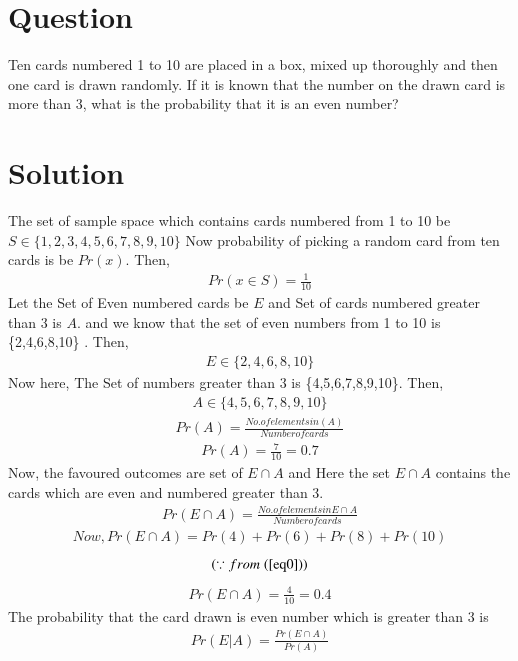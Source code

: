 \documentclass[journal,12pt,twocolumn]{IEEEtran}
\begin{document}
\section*{Question}
Ten cards numbered 1 to 10 are placed in
a box, mixed up thoroughly and then one
card is drawn randomly. If it is known that
the number on the drawn card is more than
3, what is the probability that it is an even
number?
\section*{Solution}
The set of sample space which contains cards numbered from 1 to 10 be $S \in \{1,2,3,4,5,6,7,8,9,10\}$
Now probability of picking a random card from ten cards is be $Pr(x)$. Then,
\begin{align}
\label{eq0}
Pr(x\in S )=\frac{1}{10}
\end{align}
Let the Set of Even numbered cards be $E$ and Set of cards numbered greater than 3 is $A$.
and we know that the set of even numbers from 1 to 10 is \{2,4,6,8,10\} . Then,
\begin{align}
E \in \{2,4,6,8,10\}    
\end{align}
Now here, The Set of numbers greater than 3 
is \{4,5,6,7,8,9,10\}. Then,
\begin{align}
    A \in \{4,5,6,7,8,9,10\}
\end{align}
\begin{align}
    Pr(A)=\frac{No. of elements in (A)}{Number of cards}
\end{align}
\begin{align}
\label{eq1}
    Pr(A)=\frac{7}{10}=0.7
\end{align}
Now, the favoured outcomes are set of $E \cap A$ and 
Here the set $E \cap A$ contains the cards which are even and numbered greater than 3.
\begin{align}
    Pr(E \cap A)=\frac{No. of elements in E\cap A}{Number of cards}
\end{align}
\begin{align}
   Now , Pr(E \cap A) = Pr(4)+Pr(6)+Pr(8)+Pr(10)
\end{align}
$$(\because from \; (\ref{eq0}) )$$
\begin{align}
\label{eq2}
     Pr(E \cap A) =\frac{4}{10}=0.4 
\end{align}
The probability that the card drawn is even number which is greater than 3 is
\begin{align}
    Pr(E|A)=\frac{Pr(E\cap A)}{Pr(A)}
\end{align}
\end{document}
